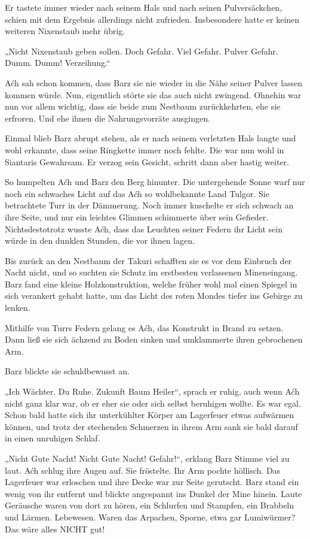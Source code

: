 Er tastete immer wieder nach seinem Hals und nach seinen Pulversäckchen, schien mit dem Ergebnis allerdings nicht zufrieden. Insbesondere hatte er keinen weiteren Nixenstaub mehr übrig.

„Nicht Nixenstaub geben sollen. Doch Gefahr. Viel Gefahr. Pulver Gefahr. Dumm. Dumm! Verzeihung.“

Aćh sah schon kommen, dass Barz sie nie wieder in die Nähe seiner Pulver lassen kommen würde. Nun, eigentlich störte sie das auch nicht zwingend. Ohnehin war nun vor allem wichtig, dass sie beide zum Nestbaum zurückkehrten, ehe sie erfroren. Und ehe ihnen die Nahrungsvorräte ausgingen.

Einmal blieb Barz abrupt stehen, als er nach seinem verletzten Hals langte und wohl erkannte, dass seine Ringkette immer noch fehlte. Die war nun wohl in Siantaris Gewahrsam. Er verzog sein Gesicht, schritt dann aber hastig weiter.

So humpelten Aćh und Barz den Berg hinunter. Die untergehende Sonne warf nur noch ein schwaches Licht auf das Aćh so wohlbekannte Land Tulgor. Sie betrachtete Turr in der Dämmerung. Noch immer kuschelte er sich schwach an ihre Seite, und nur ein leichtes Glimmen schimmerte über sein Gefieder. Nichtsdestotrotz wusste Aćh, dass das Leuchten seiner Federn ihr Licht sein würde in den dunklen Stunden, die vor ihnen lagen.

Bis zurück an den Nestbaum der Takuri schafften sie es vor dem Einbruch der Nacht nicht, und so suchten sie Schutz im erstbesten verlassenen Mineneingang. Barz fand eine kleine Holzkonstruktion, welche früher wohl mal einen Spiegel in sich verankert gehabt hatte, um das Licht des roten Mondes tiefer ins Gebirge zu lenken.

Mithilfe von Turrs Federn gelang es Aćh, das Konstrukt in Brand zu setzen. Dann ließ sie sich ächzend zu Boden sinken und umklammerte ihren gebrochenen Arm.

Barz blickte sie schuldbewusst an.

„Ich Wächter. Du Ruhe. Zukunft Baum Heiler“, sprach er ruhig, auch wenn Aćh nicht ganz klar war, ob er eher sie oder sich selbst beruhigen wollte. Es war egal. Schon bald hatte sich ihr unterkühlter Körper am Lagerfeuer etwas aufwärmen können, und trotz der stechenden Schmerzen in ihrem Arm sank sie bald darauf in einen unruhigen Schlaf.



\trennzeichen



„Nicht Gute Nacht! Nicht Gute Nacht! Gefahr!“, erklang Barz Stimme viel zu laut. Aćh schlug ihre Augen auf. Sie fröstelte. Ihr Arm pochte höllisch. Das Lagerfeuer war erloschen und ihre Decke war zur Seite gerutscht. Barz stand ein wenig von ihr entfernt und blickte angespannt ins Dunkel der Mine hinein. Laute Geräusche waren von dort zu hören, ein Schlurfen und Stampfen, ein Brabbeln und Lärmen. Lebewesen. Waren das Arpachen, Sporne, etwa gar Lumiwürmer? Das wäre alles NICHT gut!

